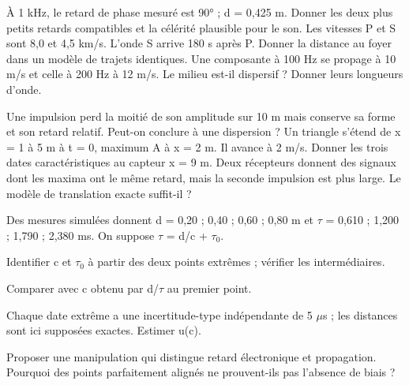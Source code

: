 À 1 kHz, le retard de phase mesuré est 90° ; d = 0,425 m. Donner les deux plus petits retards compatibles et la célérité plausible pour le son.
Les vitesses P et S sont 8,0 et 4,5 km/s. L’onde S arrive 180 s après P. Donner la distance au foyer dans un modèle de trajets identiques.
Une composante à 100 Hz se propage à 10 m/s et celle à 200 Hz à 12 m/s. Le milieu est-il dispersif ? Donner leurs longueurs d’onde.


Une impulsion perd la moitié de son amplitude sur 10 m mais conserve sa forme et son retard relatif. Peut-on conclure à une dispersion ?
Un triangle s’étend de x = 1 à 5 m à t = 0, maximum A à x = 2 m. Il avance à 2 m/s. Donner les trois dates caractéristiques au capteur x = 9 m.
Deux récepteurs donnent des signaux dont les maxima ont le même retard, mais la seconde impulsion est plus large. Le modèle de translation exacte suffit-il ?


\label{ch08-ex-D1}
Des mesures simulées donnent d = 0,20 ; 0,40 ; 0,60 ; 0,80 m et \ensuremath{\tau} = 0,610 ; 1,200 ; 1,790 ; 2,380 ms. On suppose \ensuremath{\tau} = d/c + \ensuremath{\tau_0}.\begin{questions}
\item Identifier c et \ensuremath{\tau_0} à partir des deux points extrêmes ; vérifier les intermédiaires.
\item Comparer avec c obtenu par d/\ensuremath{\tau} au premier point.
\item Chaque date extrême a une incertitude-type indépendante de 5 \ensuremath{\mu}s ; les distances sont ici supposées exactes. Estimer u(c).
\item Proposer une manipulation qui distingue retard électronique et propagation. Pourquoi des points parfaitement alignés ne prouvent-ils pas l’absence de biais ?
\end{questions}


